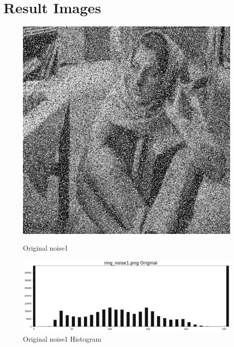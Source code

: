 \documentclass[12pt,a4paper]{report}
\begin{document}
\chapter{Result Images}
\begin{figure}[!htb]
  \centering
  \includegraphics[width=1\linewidth]{test_img/noise1.png}
  \caption{Original noise1}
  \includegraphics[width=1\linewidth]{result_img/noise1_his.png}
  \caption{Original noise1 Histogram}
\end{figure}
\end{document}
